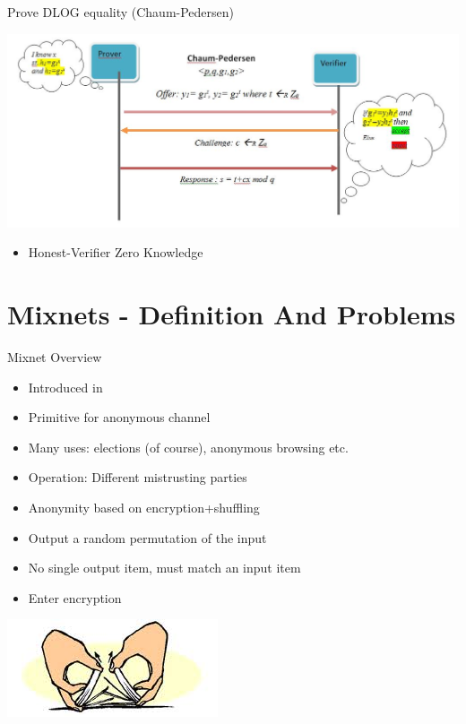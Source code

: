 \documentclass{beamer}
\begin{document}
\begin{frame}{Prove DLOG equality (Chaum-Pedersen)}
\begin{center}
\includegraphics[scale=0.3]{chaumpedersen.jpg}
\end{center}
\begin{itemize}
\item  Honest-Verifier Zero Knowledge
\end{itemize}
\end{frame} 

\section{Mixnets - Definition And Problems}

\begin{frame}{Mixnet Overview}
\begin{itemize}
\item Introduced in \cite{Chaum81}
\item Primitive for anonymous channel
\item Many uses: elections (of course), anonymous browsing etc.
\item Operation: Different mistrusting parties
\item Anonymity based on encryption+shuffling
\item Output a random permutation of the input
\item No single output item, must match an input item
\item Enter encryption
\end{itemize}
\begin{center}
\includegraphics[scale=0.3]{shuffle2.jpg}
\end{center}
\end{frame} 
\end{document}
